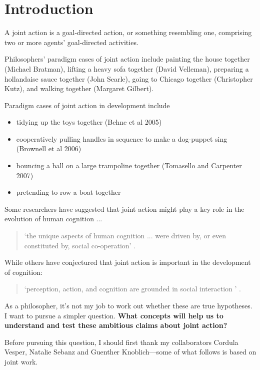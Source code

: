 \documentclass[14pt,a4paper]{extarticle}
\begin{document}
\section{Introduction}
A joint action is a goal-directed action, or something resembling one, comprising two or more agents' goal-directed activities. 

Philosophers' paradigm cases of joint action include painting the house together (Michael Bratman), lifting a heavy sofa together (David Velleman), preparing a hollandaise sauce together (John Searle), going to Chicago together (Christopher Kutz), and walking together (Margaret Gilbert).

Paradigm cases of joint action in development include
%
\begin{itemize}
\item tidying up the toys together 
(Behne et al 2005)
\item cooperatively pulling handles in sequence to make a dog-puppet sing 
(Brownell et al 2006)
\item bouncing a ball on a large trampoline together 
(Tomasello and Carpenter 2007)
\item pretending to row a boat together
\end{itemize}


Some researchers have suggested that joint action might play a key role in the evolution of human cognition ...
%
\begin{quote} 
`the unique aspects of human cognition ... were driven by, or even constituted by, social co-operation'
\citep[p.\ 1]{Moll:2007gu}.
\end{quote}
%
While others have conjectured that joint action is important in the development of cognition:
%
\begin{quote} 
`perception, action, and cognition are grounded in social interaction%
' \citep[p.\ 103]{Knoblich:2006bn}.
\end{quote}
%
As a philosopher, it's not my job to work out whether these are true hypotheses.  I want to pursue a simpler question.  
\textbf{What concepts will help us to understand and test these ambitious claims about joint action?}

Before pursuing this question,
I should first thank my collaborators Cordula Vesper, Natalie Sebanz and Guenther Knoblich---some of what follows is based on joint work.
\end{document}
